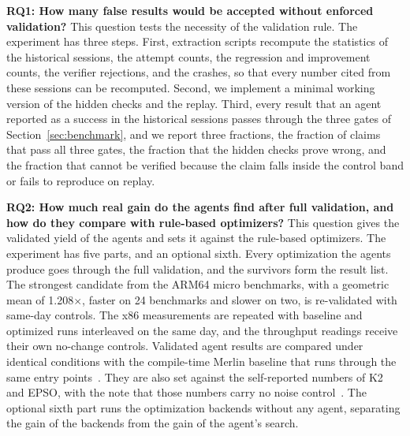 \noindent\textbf{RQ1: How many false results would be accepted without enforced validation?}
This question tests the necessity of the validation rule.
The experiment has three steps.
First, extraction scripts recompute the statistics of the historical sessions, the attempt counts, the regression and improvement counts, the verifier rejections, and the crashes, so that every number cited from these sessions can be recomputed.
Second, we implement a minimal working version of the hidden checks and the replay.
Third, every result that an agent reported as a success in the historical sessions passes through the three gates of Section~\ref{sec:benchmark}, and we report three fractions, the fraction of claims that pass all three gates, the fraction that the hidden checks prove wrong, and the fraction that cannot be verified because the claim falls inside the control band or fails to reproduce on replay.

\noindent\textbf{RQ2: How much real gain do the agents find after full validation, and how do they compare with rule-based optimizers?}
This question gives the validated yield of the agents and sets it against the rule-based optimizers.
The experiment has five parts, and an optional sixth.
Every optimization the agents produce goes through the full validation, and the survivors form the result list.
The strongest candidate from the ARM64 micro benchmarks, with a geometric mean of 1.208$\times$, faster on 24 benchmarks and slower on two, is re-validated with same-day controls.
The x86 measurements are repeated with baseline and optimized runs interleaved on the same day, and the throughput readings receive their own no-change controls.
Validated agent results are compared under identical conditions with the compile-time Merlin baseline that runs through the same entry points~\cite{mao2024merlin}.
They are also set against the self-reported numbers of K2 and EPSO, with the note that those numbers carry no noise control~\cite{xu2021synthesizing,zhu2025epso}.
The optional sixth part runs the optimization backends without any agent, separating the gain of the backends from the gain of the agent's search.

